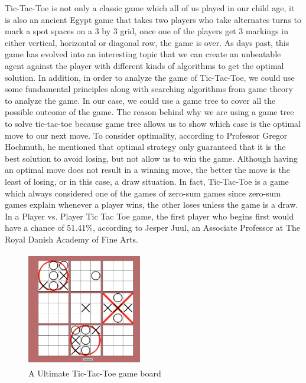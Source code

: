 \documentclass[12pt]{article}
\begin{document}
Tic-Tac-Toe is not only a classic game which all of us played in our child age, it is also an ancient Egypt game that takes two players who take alternates turns to mark a spot spaces on a 3 by 3 grid, once one of the players get 3 markings in either vertical, horizontal or diagonal row, the game is over.\cite{Borovska:2007:EPM:1330598.1330615} As days past, this game has evolved into an interesting topic that we can create an unbeatable agent against the player with different kinds of algorithms to get the optimal solution. In addition, in order to analyze the game of Tic-Tac-Toe, we could use some fundamental principles along with searching algorithms from game theory to analyze the game. In our case, we could use a game tree to cover all the possible outcome of the game. The reason behind why we are using a game tree to solve tic-tac-toe because game tree allows us to show which case is the optimal move to our next move. To consider optimality, according to Professor Gregor Hochmuth, he mentioned that optimal strategy only guaranteed that it is the best solution to avoid losing, but not allow us to win the game\cite{hochmuth_2003}. Although having an optimal move does not result in a winning move, the better the move is the least of losing, or in this case, a draw situation. In fact, Tic-Tac-Toe is a game which always considered one of the games of zero-sum games since zero-sum games explain whenever a player wins, the other loses unless the game is a draw. In a Player vs. Player Tic Tac Toe game, the first player who begins first would have a chance of 51.41\%, according to Jesper Juul, an Associate Professor at The Royal Danish Academy of Fine Arts.\cite{juul}
\begin{figure}
\begin{center}
\includegraphics[width=5cm,height=5cm]{tictactoe.png}
\caption{A Ultimate Tic-Tac-Toe game board}
\end{center}
\end{figure}
\\\\
\end{document}
